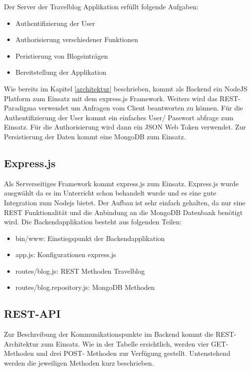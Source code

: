 \documentclass[../main.tex]{subfiles}
\begin{document}
Der Server der Travelblog Applikation erfüllt folgende Aufgaben:
\begin{itemize}
    \item Authentifizierung der User
    \item Authorisierung verschiedener Funktionen
    \item Peristierung von Blogeinträgen
    \item Bereitstellung der Applikation
\end{itemize}
Wie bereits im Kapitel \ref{architektur} beschrieben, kommt als Backend ein NodeJS Platform zum Einsatz mit dem express.js Framework. Weiters wird das REST- Paradigma verwendet um Anfragen vom Client beantworten zu können. Für die Authentifizierung der User kommt ein einfaches User/ Passwort abfrage zum Einsatz. Für die Authorisierung wird dann ein JSON Web Token verwendet. Zur Persistierung der Daten kommt eine MongoDB zum Einsatz.

\subsection{Express.js}
Als Serverseitiges Framework kommt express.js zum Einsatz. Express.js wurde ausgwählt da es im Unterricht schon behandelt wurde und es eine gute Integration zum Nodejs bietet. Der Aufbau ist sehr einfach gehalten, da nur eine REST Funktionalität und die Anbindung an die MongoDB Datenbank benötigt wird. Die Backendapplikation besteht aus folgenden Teilen:
\begin{itemize}
    \item bin/www: Einstiegspunkt der Backendapplikation
    \item app.js: Konfigurationen express.js
    \item routes/blog.js: REST Methoden Travelblog
    \item routes/blog.repository.js: MongoDB Methoden
\end{itemize}

\subsection{REST-API}
Zur Beschreibung der Kommunikationspunkte im Backend kommt die REST- Architektur zum Einsatz. Wie in der Tabelle ersichtlich, werden vier GET- Methoden und drei POST- Methoden zur Verfügung gestellt. Untenstehend werden die jeweiligen Methoden kurz beschrieben.\\
\end{document}
